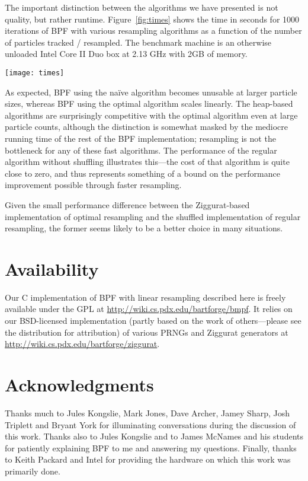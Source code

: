 \documentclass{article}
\begin{document}
  The important distinction between the algorithms we have
  presented is not quality, but rather runtime.
  Figure~\ref{fig:times} shows the time in seconds for 1000
  iterations of BPF with various resampling algorithms as a
  function of the number of particles tracked / resampled.
  The benchmark machine is an otherwise unloaded Intel Core
  II Duo box at 2.13 GHz with 2GB of memory.

  \begin{figure*}[t]
    \centering
    \texttt{[image: times]}
    \caption{Runtimes for BPF Resampling Implementations}\label{fig:times}
  \end{figure*}

  As expected, BPF using the na\"ive algorithm becomes
  unusable at larger particle sizes, whereas BPF using the
  optimal algorithm scales linearly.  The heap-based
  algorithms are surprisingly competitive with the optimal
  algorithm even at large particle counts, although the
  distinction is somewhat masked by the mediocre running
  time of the rest of the BPF implementation; resampling is
  not the bottleneck for any of these fast algorithms.  The
  performance of the regular algorithm without shuffling
  illustrates this---the cost of that algorithm is quite
  close to zero, and thus represents something of a bound on
  the performance improvement possible through faster
  resampling.

  Given the small performance difference between the
  Ziggurat-based implementation of optimal resampling and
  the shuffled implementation of regular resampling, the
  former seems likely to be a better choice in many
  situations.

\section{Availability}

  Our C implementation of BPF with linear resampling
  described here is freely available under the GPL at
  \url{http://wiki.cs.pdx.edu/bartforge/bmpf}.  It relies on
  our BSD-licensed implementation (partly based on the work
  of others---please see the distribution for attribution)
  of various PRNGs and Ziggurat generators at
  \url{http://wiki.cs.pdx.edu/bartforge/ziggurat}.

\section{Acknowledgments}

  Thanks much to Jules Kongslie, Mark Jones, Dave Archer,
  Jamey Sharp, Josh Triplett and Bryant York for
  illuminating conversations during the discussion of this
  work.  Thanks also to Jules Kongslie and to James McNames
  and his students for patiently explaining BPF to me and
  answering my questions.  Finally, thanks to Keith Packard
  and Intel for providing the hardware on which this work
  was primarily done.



\end{document}
